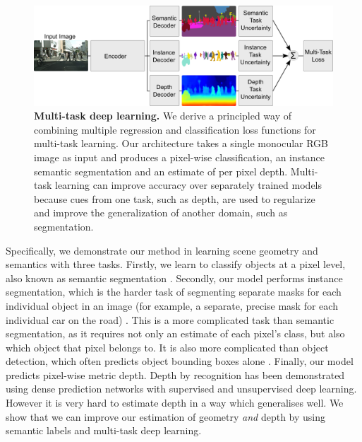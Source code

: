 \begin{figure}[t]
\begin{center}
		\includegraphics[width=\linewidth]{figures/multitask-architecture.pdf}    
\end{center}
   \caption[Multitask deep learning for scene understanding.]{\textbf{Multi-task deep learning.} We derive a principled way of combining multiple regression and classification loss functions for multi-task learning. Our architecture takes a single monocular RGB image as input and produces a pixel-wise classification, an instance semantic segmentation and an estimate of per pixel depth. Multi-task learning can improve accuracy over separately trained models because cues from one task, such as depth, are used to regularize and improve the generalization of another domain, such as segmentation.}
\label{fig:teaser}
\end{figure}

Specifically, we demonstrate our method in learning scene geometry and semantics with three tasks. Firstly, we learn to classify objects at a pixel level, also known as semantic segmentation \citep{long2015fully,badrinarayanan2017segnet,YuKoltun2016,chen2016deeplab,CRFRNN}. Secondly, our model performs instance segmentation, which is the harder task of segmenting separate masks for each individual object in an image (for example, a separate, precise mask for each individual car on the road) \citep{pinheiro2015learning,hariharan2015hypercolumns,dai2016instance,bai2016deep}. This is a more complicated task than semantic segmentation, as it requires not only an estimate of each pixel's class, but also which object that pixel belongs to. It is also more complicated than object detection, which often predicts object bounding boxes alone \citep{girshick2014rich}. Finally, our model predicts pixel-wise metric depth. Depth by recognition has been demonstrated using dense prediction networks with supervised \citep{eigen2015predicting} and unsupervised \citep{garg2016unsupervised} deep learning. However it is very hard to estimate depth in a way which generalises well. We show that we can improve our estimation of geometry \textit{and} depth by using semantic labels and multi-task deep learning.

